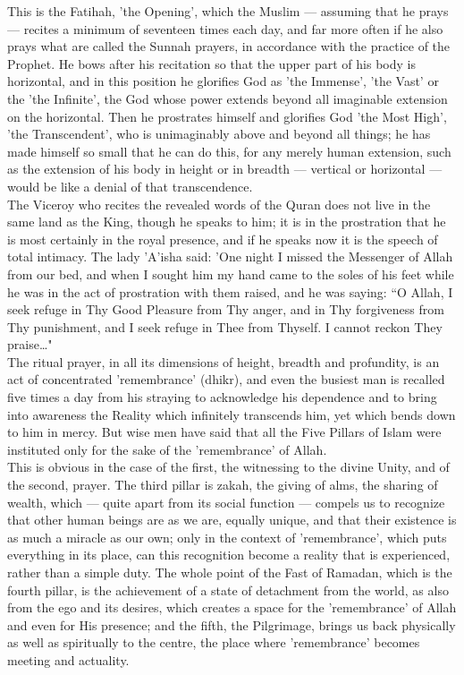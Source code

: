 \documentclass[10pt, twoside]{book}
\begin{document}
This is the Fatihah, 'the Opening', which the Muslim --- assuming that he prays --- recites a minimum of 
seventeen times each day, and far more often if he also prays what are called the Sunnah prayers, in 
accordance with the practice of the Prophet. He bows after his recitation so that the upper part of 
his body is horizontal, and in this position he glorifies God as 'the Immense', 'the Vast' or the 
'the Infinite', the God whose power extends beyond all imaginable extension on the horizontal. Then 
he prostrates himself and glorifies God 'the Most High', 'the Transcendent', who is unimaginably 
above and beyond all things; he has made himself so small that he can do this, for any merely human 
extension, such as the extension of his body in height or in breadth --- vertical or horizontal --- would 
be like a denial of that transcendence. \\

The Viceroy who recites the revealed words of the Quran does not live in the same land as the King, 
though he speaks to him; it is in the prostration that he is most certainly in the royal presence, 
and if he speaks now it is the speech of total intimacy. The lady 'A'isha said: 'One night I missed 
the Messenger of Allah from our bed, and when I sought him my hand came to the soles of his feet 
while he was in the act of prostration with them raised, and he was saying: ``O Allah, I seek refuge 
in Thy Good Pleasure from Thy anger, and in Thy forgiveness from Thy punishment, and I seek refuge in 
Thee from Thyself. I cannot reckon They praise\ldots{}" \\

The ritual prayer, in all its dimensions of height, breadth and profundity, is an act of concentrated 
'remembrance' (dhikr), and even the busiest man is recalled five times a day from his straying to 
acknowledge his dependence and to bring into awareness the Reality which infinitely transcends him, 
yet which bends down to him in mercy. But wise men have said that all the Five Pillars of Islam were 
instituted only for the sake of the 'remembrance' of Allah. \\

This is obvious in the case of the first, the witnessing to the divine Unity, and of the second, 
prayer. The third pillar is zakah, the giving of alms, the sharing of wealth, which --- quite apart 
from its social function --- compels us to recognize that other human beings are as we are, equally 
unique, and that their existence is as much a miracle as our own; only in the context of 
'remembrance', which puts everything in its place, can this recognition become a reality that is 
experienced, rather than a simple duty. The whole point of the Fast of Ramadan, which is the fourth 
pillar, is the achievement of a state of detachment from the world, as also from the ego and its 
desires, which creates a space for the 'remembrance' of Allah and even for His presence; and the 
fifth, the Pilgrimage, brings us back physically as well as spiritually to the centre, the place 
where 'remembrance' becomes meeting and actuality. \\
\end{document}
